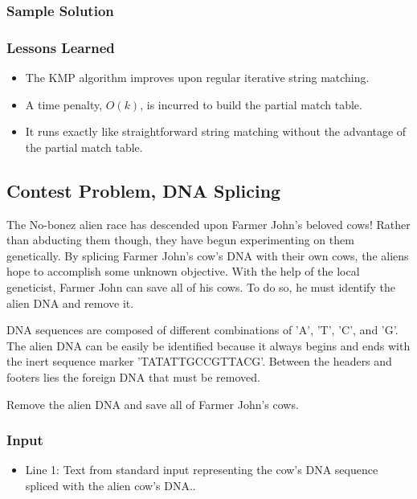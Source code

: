 \subsubsection{Sample Solution}


\subsubsection{Lessons Learned}
\begin{itemize}
	\item The KMP algorithm improves upon regular iterative string matching.
	\item A time penalty, $O(k)$, is incurred to build the partial match table.
	\item It runs exactly like straightforward string matching without the advantage of the partial match table.
\end{itemize}

\subsection{Contest Problem, DNA Splicing}
The No-bonez alien race has descended upon Farmer John's beloved cows!
Rather than abducting them though, they have begun experimenting on them genetically.
By splicing Farmer John's cow's DNA with their own cows, the aliens hope to accomplish some unknown objective.
With the help of the local geneticist, Farmer John can save all of his cows.
To do so, he must identify the alien DNA and remove it.

DNA sequences are composed of different combinations of 'A', 'T', 'C', and 'G'.
The alien DNA can be easily be identified because it always begins and ends with the inert sequence marker \mbox{'TATATTGCCGTTACG'}.
Between the headers and footers lies the foreign DNA that must be removed.

Remove the alien DNA and save all of Farmer John's cows.

\subsubsection{Input}
\begin{itemize}
\item Line 1: Text from standard input representing the cow's DNA sequence spliced with the alien cow's DNA..
\end{itemize}


